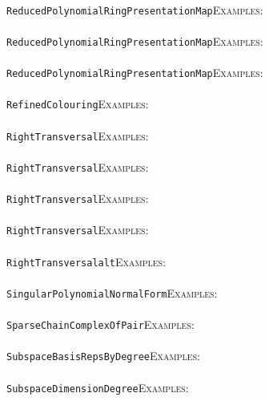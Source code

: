\documentclass[a4paper,11pt]{report}
\begin{document}
{{ \\
 \texttt{ReducedPolynomialRingPresentationMap}{\nobreakspace}{\nobreakspace}{\nobreakspace}{\nobreakspace}\textsc{Examples:} \\
 \\
 \texttt{ReducedPolynomialRingPresentationMap}{\nobreakspace}{\nobreakspace}{\nobreakspace}{\nobreakspace}\textsc{Examples:} \\
 \\
 \texttt{ReducedPolynomialRingPresentationMap}{\nobreakspace}{\nobreakspace}{\nobreakspace}{\nobreakspace}\textsc{Examples:} \\
 \\
 \texttt{RefinedColouring}{\nobreakspace}{\nobreakspace}{\nobreakspace}{\nobreakspace}\textsc{Examples:} \\
 \\
 \texttt{RightTransversal}{\nobreakspace}{\nobreakspace}{\nobreakspace}{\nobreakspace}\textsc{Examples:} \\
 \\
 \texttt{RightTransversal}{\nobreakspace}{\nobreakspace}{\nobreakspace}{\nobreakspace}\textsc{Examples:} \\
 \\
 \texttt{RightTransversal}{\nobreakspace}{\nobreakspace}{\nobreakspace}{\nobreakspace}\textsc{Examples:} \\
 \\
 \texttt{RightTransversal}{\nobreakspace}{\nobreakspace}{\nobreakspace}{\nobreakspace}\textsc{Examples:} \\
 \\
 \texttt{RightTransversal{\textunderscore}alt}{\nobreakspace}{\nobreakspace}{\nobreakspace}{\nobreakspace}\textsc{Examples:} \\
 \\
 \texttt{SingularPolynomialNormalForm}{\nobreakspace}{\nobreakspace}{\nobreakspace}{\nobreakspace}\textsc{Examples:} \\
 \\
 \texttt{SparseChainComplexOfPair}{\nobreakspace}{\nobreakspace}{\nobreakspace}{\nobreakspace}\textsc{Examples:} \\
 \\
 \texttt{SubspaceBasisRepsByDegree}{\nobreakspace}{\nobreakspace}{\nobreakspace}{\nobreakspace}\textsc{Examples:} \\
 \\
 \texttt{SubspaceDimensionDegree}{\nobreakspace}{\nobreakspace}{\nobreakspace}{\nobreakspace}\textsc{Examples:} \\
}}
\end{document}
